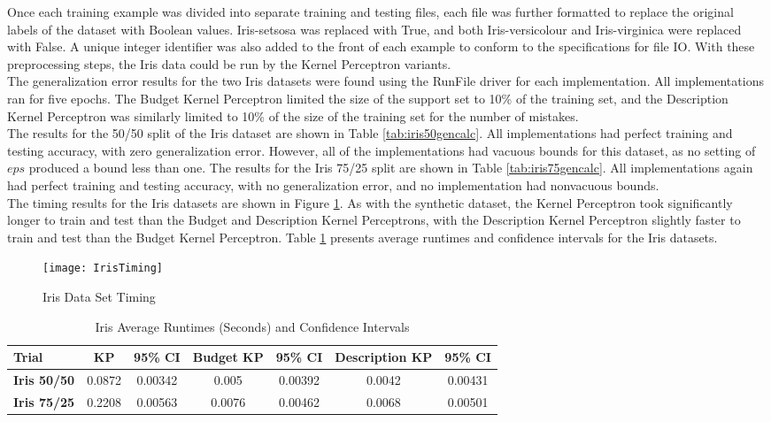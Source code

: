 Once each training example was divided into separate training and testing files, each file was further formatted to replace the original labels of the dataset with Boolean values. Iris-setsosa was replaced with True, and both Iris-versicolour and Iris-virginica were replaced with False. A unique integer identifier was also added to the front of each example to conform to the specifications for file IO. With these preprocessing steps, the Iris data could be run by the Kernel Perceptron variants.
\\The generalization error results for the two Iris datasets were found using the RunFile driver for each implementation. All implementations ran for five epochs. The Budget Kernel Perceptron limited the size of the support set to 10\% of the training set, and the Description Kernel Perceptron was similarly limited to 10\% of the size of the training set for the number of mistakes. 
\\The results for the 50/50 split of the Iris dataset are shown in Table \ref{tab:iris50gencalc}. All implementations had perfect training and testing accuracy, with zero generalization error. However, all of the implementations had vacuous bounds for this dataset, as no setting of $\mathit{eps}$ produced a bound less than one. The results for the Iris 75/25 split are shown in Table \ref{tab:iris75gencalc}. All implementations again had perfect training and testing accuracy, with no generalization error, and no implementation had nonvacuous bounds.
\\The timing results for the Iris datasets are shown in Figure \ref{IrisTiming}. As with the synthetic dataset, the Kernel Perceptron took significantly longer to train and test than the Budget and Description Kernel Perceptrons, with the Description Kernel Perceptron slightly faster to train and test than the Budget Kernel Perceptron. Table \ref{tab:iristabtiming} presents average runtimes and confidence intervals for the Iris datasets.

\begin{figure}[h]
 \caption{Iris Data Set Timing}
 \label{IrisTiming}
 \begin{center}
  \texttt{[image: IrisTiming]}
 \end{center}
\end{figure}

\begin{table}[h]
 \begin{center}
  \caption{Iris Average Runtimes (Seconds) and Confidence Intervals}
  \label{tab:iristabtiming}
  \begin{tabular}{l|c|c|c|c|c|c}
  \textbf{Trial} & \textbf{KP} & \textbf{95\% CI} & \textbf{Budget KP} & \textbf{95\% CI} & \textbf{Description KP} & \textbf{95\% CI}\\
  \hline
  \textbf{Iris 50/50} & 0.0872 & 0.00342 & 0.005 & 0.00392 & 0.0042 & 0.00431\\
  \textbf{Iris 75/25} & 0.2208 & 0.00563 & 0.0076 & 0.00462 & 0.0068 & 0.00501\\
  \end{tabular}
 \end{center}
\end{table}

